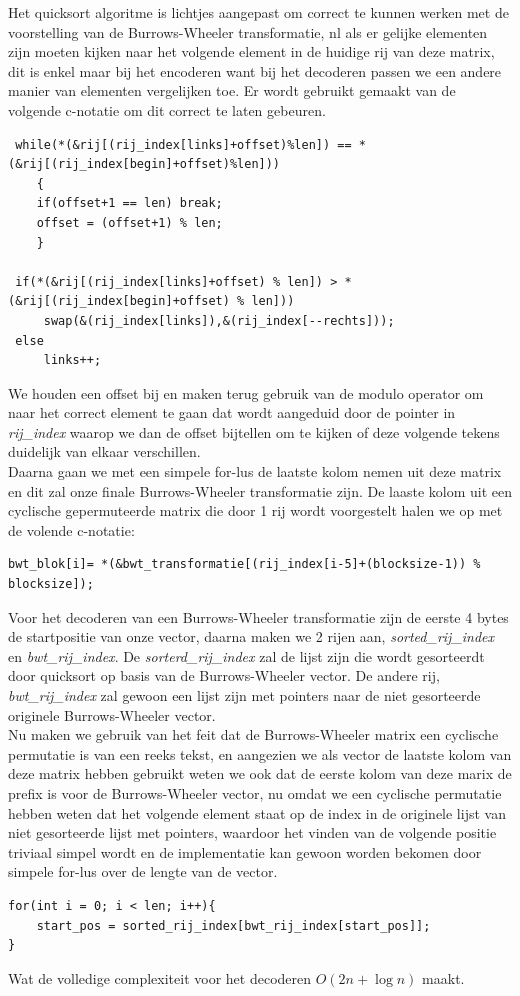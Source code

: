 \documentclass[10pt,a4paper]{report}
\begin{document}
Het quicksort algoritme is lichtjes aangepast om correct te kunnen werken met de voorstelling van de Burrows-Wheeler transformatie, nl als er gelijke elementen zijn moeten kijken naar het volgende element in de huidige rij van deze matrix, dit is enkel maar bij het encoderen want bij het decoderen passen we een andere manier van elementen vergelijken toe. Er wordt gebruikt gemaakt van de volgende c-notatie om dit correct te laten gebeuren. 
\begin{lstlisting}
 while(*(&rij[(rij_index[links]+offset)%len]) == *(&rij[(rij_index[begin]+offset)%len]))
    {
    if(offset+1 == len) break;  
    offset = (offset+1) % len;
    }
	 
 if(*(&rij[(rij_index[links]+offset) % len]) > *(&rij[(rij_index[begin]+offset) % len]))
	 swap(&(rij_index[links]),&(rij_index[--rechts]));
 else
	 links++;	 
\end{lstlisting}
We houden een offset bij en maken terug gebruik van de modulo operator om naar het correct element te gaan dat wordt aangeduid door de pointer in \emph{rij\_index} waarop we dan de offset bijtellen om te kijken of deze volgende tekens duidelijk van elkaar verschillen.\\

Daarna gaan we met een simpele for-lus de laatste kolom nemen uit deze matrix en dit zal onze finale Burrows-Wheeler transformatie zijn. De laaste kolom uit een cyclische gepermuteerde matrix die door 1 rij wordt voorgestelt halen we op met de volende c-notatie:
\begin{lstlisting}
bwt_blok[i]= *(&bwt_transformatie[(rij_index[i-5]+(blocksize-1)) % blocksize]);
\end{lstlisting}
Voor het decoderen van een Burrows-Wheeler transformatie zijn de eerste 4 bytes de startpositie van onze vector, daarna maken we 2 rijen aan, \emph{sorted\_rij\_index} en \emph{bwt\_rij\_index}. De \emph{sorterd\_rij\_index} zal de lijst zijn die wordt gesorteerdt door quicksort op basis van de Burrows-Wheeler vector. De andere rij, \emph{bwt\_rij\_index} zal gewoon een lijst zijn met pointers naar de niet gesorteerde originele Burrows-Wheeler vector. \\

Nu maken we gebruik van het feit dat de Burrows-Wheeler matrix een cyclische permutatie is van een reeks tekst, en aangezien we als vector de laatste kolom van deze matrix hebben gebruikt weten we ook dat de eerste kolom van deze marix de prefix is voor de Burrows-Wheeler vector, nu omdat we een cyclische permutatie hebben weten dat het volgende element staat op de index in de originele lijst van niet gesorteerde lijst met pointers, waardoor het vinden van de volgende positie triviaal simpel wordt en de implementatie kan gewoon worden bekomen door simpele for-lus over de lengte van de vector.
\begin{lstlisting}
for(int i = 0; i < len; i++){
	start_pos = sorted_rij_index[bwt_rij_index[start_pos]];
}
\end{lstlisting}
Wat de volledige complexiteit voor het decoderen $O(2n + \log n)$ maakt.
\end{document}
